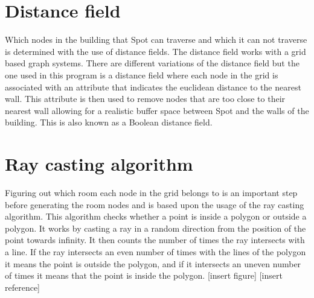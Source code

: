 \section{Distance field}
Which nodes in the building that Spot can traverse and which it can not traverse is determined with the use of distance fields. 
The distance field works with a grid based graph systems. There are different variations of the distance field \cite{distance_field} but the one used in this program is a distance field where each node in the grid is associated with an attribute that indicates the euclidean distance to the nearest wall. This attribute is then used to remove nodes that are too close to their nearest wall allowing for a realistic buffer space between Spot and the walls of the building. This is also known as a Boolean distance field.






\section{Ray casting algorithm}
Figuring out which room each node in the grid belongs to is an important step before generating the room nodes and is based upon the usage of the ray casting algorithm.
This algorithm checks whether a point is inside a polygon or outside a polygon. 
It works by casting a ray in a random direction from the position of the point towards infinity. It then counts the number of times the ray intersects with a line. If the ray intersects an even number of times with the lines of the polygon it means the point is outside the polygon, and if it intersects an uneven number of times it means that the point is inside the polygon. [insert figure] [insert reference]

